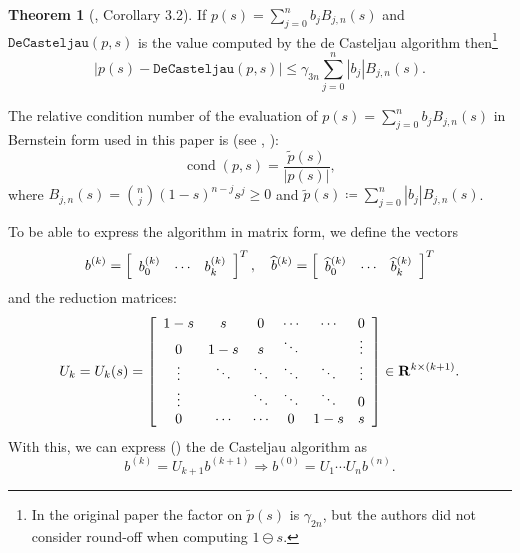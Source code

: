 \documentclass[3p, authoryear, square]{elsarticle}
\theoremstyle{definition}
\newtheorem{theorem}{Theorem}[section]
\newcommand{\cond}[1]{\operatorname{cond}\left(#1\right)}
\begin{document}
\begin{theorem}[\cite{Mainar1999}, Corollary 3.2]
If \(p(s) = \sum_{j = 0}^n b_j B_{j, n}(s)\) and \(\mathtt{DeCasteljau}(p, s)\)
is the value computed by the de Casteljau algorithm then\footnote{In the
original paper the factor on \(\widetilde{p}(s)\) is \(\gamma_{2n}\),
but the authors did not consider round-off when computing
\(1 \ominus s\).}
\begin{equation}
\left|p(s) - \mathtt{DeCasteljau}(p, s)\right| \leq \gamma_{3n}
\sum_{j = 0}^n \left|b_j\right| B_{j, n}(s).
\end{equation}
\end{theorem}

The relative condition number of the evaluation of \(p(s) = \sum_{j = 0}^n
b_j B_{j, n}(s)\) in Bernstein form used in this paper is (see
\cite{Mainar1999}, \cite{Farouki1987}):
\begin{equation}
\cond{p, s} = \frac{\widetilde{p}(s)}{\left|p(s)\right|},
\end{equation}
where \(B_{j, n}(s) = \binom{n}{j} (1 - s)^{n - j} s^j \geq 0\) and
\(\widetilde{p}(s) \coloneqq \sum_{j = 0}^n \left|b_j\right| B_{j, n}(s)\).

To be able to express the algorithm in matrix form, we define
the vectors
\begin{equation}
b^{(k)} = \left[\begin{array}{c c c} b_0^{(k)} & \cdots &
b_k^{(k)}\end{array}\right]^T, \quad
\widehat{b}^{(k)} = \left[\begin{array}{c c c} \widehat{b}_0^{(k)} & \cdots &
    \widehat{b}_k^{(k)}\end{array}\right]^T
\end{equation}
and the reduction matrices:
\begin{equation}
U_k = U_k(s) = \left[\begin{array}{c c c c c c}
    1 - s  & s      & 0      & \cdots & \cdots & 0      \\
    0      & 1 - s  & s      & \ddots &        & \vdots \\
    \vdots & \ddots & \ddots & \ddots & \ddots & \vdots \\
    \vdots &        & \ddots & \ddots & \ddots & 0 \\
    0      & \cdots & \cdots & 0      & 1 - s  & s
\end{array}\right] \in \mathbf{R}^{k \times (k + 1)}.
\end{equation}
With this, we can express (\cite{Mainar1999}) the de Casteljau algorithm as
\begin{equation}\label{matrix-de-casteljau}
b^{(k)} = U_{k + 1} b^{(k + 1)}
\Longrightarrow b^{(0)} = U_1 \cdots U_n b^{(n)}.
\end{equation}
\end{document}
